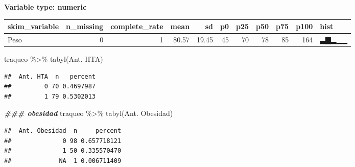 \documentclass[
]{article}
\newenvironment{Shaded}{\begin{snugshade}}{\end{snugshade}}
\newcommand{\AttributeTok}[1]{\textcolor[rgb]{0.77,0.63,0.00}{#1}}
\newcommand{\DecValTok}[1]{\textcolor[rgb]{0.00,0.00,0.81}{#1}}
\newcommand{\DocumentationTok}[1]{\textcolor[rgb]{0.56,0.35,0.01}{\textbf{\textit{#1}}}}
\newcommand{\FunctionTok}[1]{\textcolor[rgb]{0.00,0.00,0.00}{#1}}
\newcommand{\NormalTok}[1]{#1}
\newcommand{\OtherTok}[1]{\textcolor[rgb]{0.56,0.35,0.01}{#1}}
\newcommand{\SpecialCharTok}[1]{\textcolor[rgb]{0.00,0.00,0.00}{#1}}
\newcommand{\StringTok}[1]{\textcolor[rgb]{0.31,0.60,0.02}{#1}}
\begin{document}
\textbf{Variable type: numeric}

\begin{longtable}[]{@{}lrrrrrrrrrl@{}}
\toprule
skim\_variable & n\_missing & complete\_rate & mean & sd & p0 & p25 &
p50 & p75 & p100 & hist \\
\midrule
\endhead
Peso & 0 & 1 & 80.57 & 19.45 & 45 & 70 & 78 & 85 & 164 & ▃▇▂▁▁ \\
\bottomrule
\end{longtable}

\begin{Shaded}
\begin{Highlighting}[]
\NormalTok{traqueo }\SpecialCharTok{\%\textgreater{}\%}
  \FunctionTok{tabyl}\NormalTok{(}\StringTok{\textasciigrave{}}\AttributeTok{Ant. HTA}\StringTok{\textasciigrave{}}\NormalTok{)}
\end{Highlighting}
\end{Shaded}

\begin{verbatim}
##  Ant. HTA  n   percent
##         0 70 0.4697987
##         1 79 0.5302013
\end{verbatim}

\begin{Shaded}
\begin{Highlighting}[]
\DocumentationTok{\#\#\# obesidad}
\NormalTok{traqueo }\SpecialCharTok{\%\textgreater{}\%}
  \FunctionTok{tabyl}\NormalTok{(}\StringTok{\textasciigrave{}}\AttributeTok{Ant. Obesidad}\StringTok{\textasciigrave{}}\NormalTok{)}
\end{Highlighting}
\end{Shaded}

\begin{verbatim}
##  Ant. Obesidad  n     percent
##              0 98 0.657718121
##              1 50 0.335570470
##             NA  1 0.006711409
\end{verbatim}

\begin{Shaded}
\end{Shaded}
\end{document}
